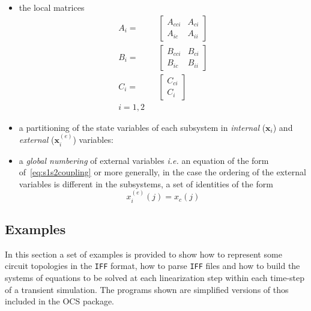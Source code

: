 \documentclass{scrartcl}
\newcommand{\Iff}{{\tt IFF}}
\begin{document}
\begin{itemize}
\item the local matrices 
  \begin{eqnarray}
    \label{eq:locmati}
    A_{i} = & &
    \left[ \begin{array}{cc} A_{cci} & A_{ci} \nonumber \\   
        A_{ic} & A_{ii} \end{array}  \right]\\
    B_{i} = & &
    \left[ \begin{array}{cc} B_{cci} & B_{ci} \\   
        B_{ic} & B_{ii} \end{array} \right] \nonumber \\
    C_{i} = & &
    \left[ \begin{array}{c} C_{ci} \\   
        C_{i} \end{array} \right] \nonumber \\
    i=1,2 && \nonumber
  \end{eqnarray}
\item a partitioning of the state variables of each subsystem in 
  \emph{internal} ($\mathbf{x}_{i}$) and \emph{external}
  ($\mathbf{x}_{i}^{(e)}$) variables:
\item a \emph{global numbering} of external variables {\it i.e.} an 
  equation of the form of~\eqref{eq:s1s2coupling} or more generally,
  in the case the ordering of the external variables is different in
  the subsystems, a set of identities of the form 
  $$ x_{i}^{(e)} (j) = x_c (j)$$
\end{itemize}


\subsection{Examples}

In this section a set of examples is provided to show how to represent some
circuit topologies in the {\Iff} format, how to parse {\Iff} files and how
to build the systems of equations to be solved at each linearization step 
within each time-step of a transient simulation.
The programs shown are simplified versions of thos included in the OCS package.
\end{document}
